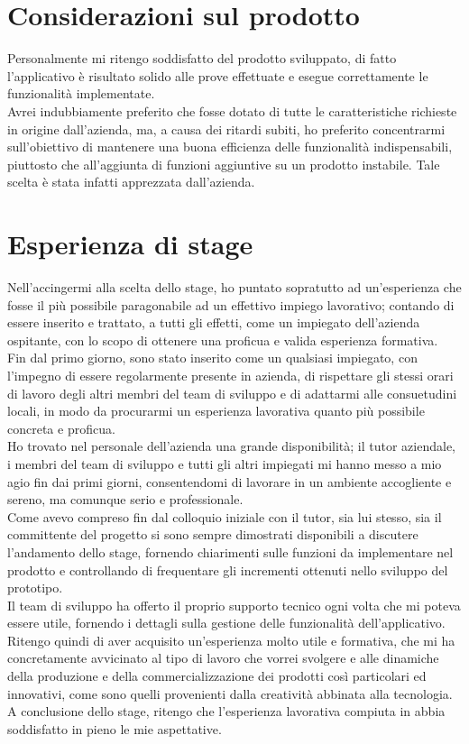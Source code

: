 \section{Considerazioni sul prodotto}
Personalmente mi ritengo soddisfatto del prodotto sviluppato, di fatto l'applicativo è risultato solido alle prove effettuate e esegue correttamente le funzionalità implementate.
\\
Avrei indubbiamente preferito che fosse dotato di tutte le caratteristiche richieste  in origine dall'azienda, ma, a causa dei ritardi subiti, ho preferito concentrarmi sull'obiettivo di mantenere una buona efficienza delle funzionalità indispensabili, piuttosto che all'aggiunta di funzioni aggiuntive su un prodotto instabile. Tale scelta è stata infatti apprezzata dall'azienda.
\section{Esperienza di stage}
Nell'accingermi alla scelta dello stage, ho puntato sopratutto ad un'esperienza che fosse il più possibile paragonabile ad un effettivo impiego lavorativo; contando di essere inserito e trattato, a tutti gli effetti, come un impiegato dell'azienda ospitante, con lo scopo di ottenere una proficua e valida esperienza formativa.
\\
Fin dal primo giorno, sono stato inserito come un qualsiasi impiegato, con l'impegno di essere regolarmente presente in azienda, di rispettare gli stessi orari di lavoro degli altri membri del team di sviluppo e di adattarmi alle consuetudini locali, in modo da procurarmi un esperienza lavorativa quanto più possibile concreta e proficua.
\\
Ho trovato nel personale dell'azienda una grande disponibilità; il tutor aziendale, i membri del team di sviluppo e tutti gli altri impiegati mi hanno messo a mio agio fin dai primi giorni, consentendomi di lavorare in un ambiente accogliente e sereno, ma comunque serio e professionale.
\\
Come avevo compreso fin dal colloquio iniziale con il tutor, sia lui stesso, sia il committente del progetto si sono sempre dimostrati disponibili a discutere l'andamento dello stage, fornendo chiarimenti sulle funzioni da implementare nel prodotto e controllando di frequentare gli incrementi ottenuti nello sviluppo del prototipo.
\\
Il team di sviluppo ha offerto il proprio supporto tecnico ogni volta che mi poteva essere utile, fornendo i dettagli sulla gestione delle funzionalità dell'applicativo.
\\
Ritengo quindi di aver acquisito un'esperienza molto utile e formativa, che mi ha concretamente avvicinato al tipo di lavoro che vorrei svolgere e alle dinamiche della produzione e della commercializzazione dei prodotti così particolari ed innovativi, come sono quelli provenienti dalla creatività abbinata alla tecnologia.
\\ 
A conclusione dello stage, ritengo che l'esperienza lavorativa compiuta in \asi abbia soddisfatto in pieno le mie aspettative.

